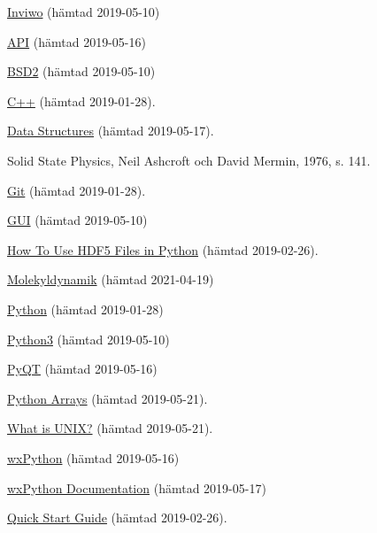 \documentclass[10pt,oneside,swedish]{article}
\begin{document}
\begin{thebibliography}{9}
  \href{https://inviwo.org/}{Inviwo} (hämtad 2019-05-10)

  \href{https://www.ne.se/uppslagsverk/encyklopedi/lång/api-(data)}{API}  (hämtad 2019-05-16)

  \href{https://opensource.org/licenses/BSD-2-Clause}{BSD2}  (hämtad 2019-05-10)

 \href{http://www.cplusplus.com/info/description/}{C++} (hämtad 2019-01-28).

  \href{https://docs.python.org/3/tutorial/datastructures.html}{Data Structures}  (hämtad 2019-05-17).

 Solid State Physics, Neil Ashcroft och David Mermin, 1976, s. 141.

  \href{https://git-scm.com}{Git} (hämtad 2019-01-28).

 \href{https://www.ne.se/uppslagsverk/encyklopedi/lång/api-(data)}{GUI} (hämtad 2019-05-10)

  \href{https://www.pythonforthelab.com/blog/how-to-use-hdf5-files-in-python/}{How To Use HDF5 Files in Python} (hämtad 2019-02-26).

 \href{https://www.ne.se/uppslagsverk/encyklopedi/lång/molekyldynamik}{Molekyldynamik} (hämtad 2021-04-19)

  \href{https://www.python.org/}{Python} (hämtad 2019-01-28)

  \href{https://docs.python.org/3/}{Python3} (hämtad 2019-05-10)

 \href{https://www.riverbankcomputing.com/static/Docs/PyQt5/}{PyQT} (hämtad 2019-05-16)

  \href{https://www.programiz.com/python-programming/array\#introduction}{Python Arrays} (hämtad 2019-05-21).

  \href{https://www.softwaretestinghelp.com/unix-introduction/}{What is UNIX?} (hämtad 2019-05-21).

  \href{https://wxpython.org/pages/overview/}{wxPython} (hämtad 2019-05-16)

  \href{https://docs.wxpython.org/wx.1moduleindex.html}{wxPython Documentation} (hämtad 2019-05-17)

  \href{http://docs.h5py.org/en/stable/quick.html\#appendix-creating-a-file}{Quick Start Guide} (hämtad 2019-02-26).


\end{thebibliography}
\end{document}
